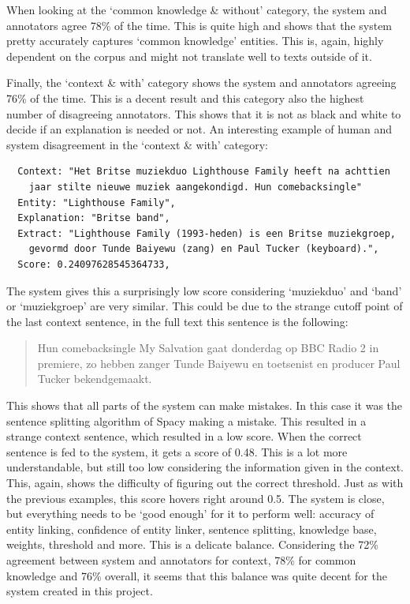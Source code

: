\documentclass[
10pt, %
a4paper, %
oneside, %
headinclude,footinclude, %
] {book}%
\begin{document}
When looking at the `common knowledge \& without' category, the system and annotators agree 78\% of the time.
This is quite high and shows that the system pretty accurately captures `common knowledge' entities.
This is, again, highly dependent on the corpus and might not translate well to texts outside of it.

Finally, the `context \& with' category shows the system and annotators agreeing 76\% of the time.
This is a decent result and this category also the highest number of disagreeing annotators.
This shows that it is not as black and white to decide if an explanation is needed or not.
An interesting example of human and system disagreement in the `context \& with' category:

\begin{verbatim}
  Context: "Het Britse muziekduo Lighthouse Family heeft na achttien
    jaar stilte nieuwe muziek aangekondigd. Hun comebacksingle"
  Entity: "Lighthouse Family",
  Explanation: "Britse band",
  Extract: "Lighthouse Family (1993-heden) is een Britse muziekgroep,
    gevormd door Tunde Baiyewu (zang) en Paul Tucker (keyboard).",
  Score: 0.24097628545364733,
\end{verbatim}

The system gives this a surprisingly low score considering `muziekduo' and `band' or `muziekgroep' are very similar.
This could be due to the strange cutoff point of the last context sentence, in the full text this sentence is the following:

\begin{quote}
  Hun comebacksingle My Salvation gaat donderdag op BBC Radio 2 in premiere, zo hebben zanger Tunde Baiyewu en toetsenist en producer Paul Tucker bekendgemaakt.
\end{quote}

This shows that all parts of the system can make mistakes.
In this case it was the sentence splitting algorithm of Spacy making a mistake.
This resulted in a strange context sentence, which resulted in a low score.
When the correct sentence is fed to the system, it gets a score of 0.48. 
This is a lot more understandable, but still too low considering the information given in the context.
This, again, shows the difficulty of figuring out the correct threshold.
Just as with the previous examples, this score hovers right around 0.5.
The system is close, but everything needs to be `good enough' for it to perform well: accuracy of entity linking, confidence of entity linker, sentence splitting, knowledge base, weights, threshold and more.
This is a delicate balance.
Considering the 72\% agreement between system and annotators for context, 78\% for common knowledge and 76\% overall, it seems that this balance was quite decent for the system created in this project.
\end{document}
